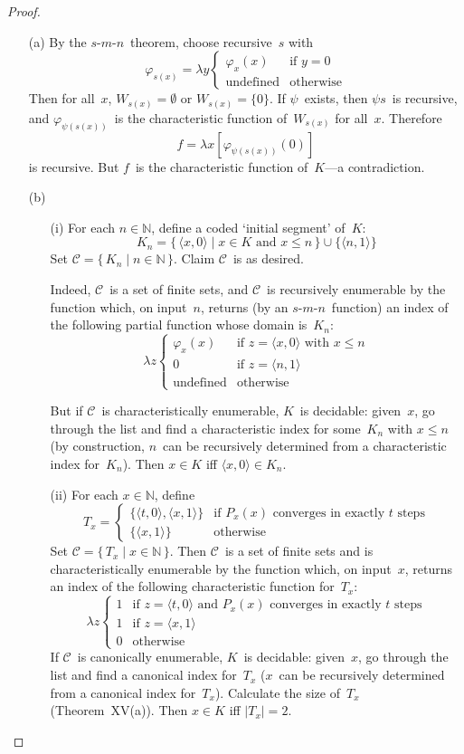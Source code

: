 \documentclass[letterpaper]{article}
\newcommand{\N}{\mathbb{N}}
\newcommand{\C}{\mathcal{C}}
\newcommand{\union}{\cup}
\newcommand{\card}[1]{|{#1}|}
\newcommand{\pair}[2]{\langle{#1},{#2}\rangle}
\newcommand{\smn}{$s$-$m$-$n$}
\theoremstyle{definition}
\theoremstyle{remark}
\theoremstyle{direction}
\begin{document}
\begin{proof}
\begin{enumerate}[itemsep=0pt]
\item[(a)] By the \smn\ theorem, choose recursive~$s$ with
$$\varphi_{s(x)}=\lambda y\begin{cases}
\varphi_x(x)&\text{if }y=0\\
\text{undefined}&\text{otherwise}
\end{cases}$$
Then for all~$x$, $W_{s(x)}=\emptyset$ or $W_{s(x)}=\{0\}$. If $\psi$~exists, then $\psi s$~is recursive, and $\varphi_{\psi(s(x))}$~is the characteristic function of~$W_{s(x)}$ for all~$x$. Therefore
$$f=\lambda x[\varphi_{\psi(s(x))}(0)]$$
is recursive. But $f$~is the characteristic function of~$K$---a contradiction.
\item[(b)]
\begin{enumerate}[itemsep=0pt]
\item[(i)] For each $n\in\N$, define a coded `initial segment' of~$K$:
$$K_n=\{\,\pair{x}{0}\mid x\in K\text{ and }x\le n\,\}\union\{\pair{n}{1}\}$$
Set $\C=\{\,K_n\mid n\in\N\,\}$. Claim $\C$~is as desired.

Indeed, $\C$~is a set of finite sets, and $\C$~is recursively enumerable by the function which, on input~$n$, returns (by an \smn\ function) an index of the following partial function whose domain is~$K_n$:
$$\lambda z\begin{cases}
\varphi_x(x)&\text{if }z=\pair{x}{0}\text{ with }x\le n\\
0&\text{if }z=\pair{n}{1}\\
\text{undefined}&\text{otherwise}
\end{cases}$$

But if $\C$~is characteristically enumerable, $K$~is decidable: given~$x$, go through the list and find a characteristic index for some~$K_n$ with $x\le n$ (by construction, $n$~can be recursively determined from a characteristic index for~$K_n$). Then $x\in K$ iff $\pair{x}{0}\in K_n$.

\item[(ii)] For each $x\in\N$, define
$$T_x=\begin{cases}
\{\pair{t}{0},\pair{x}{1}\}&\text{if }P_x(x)\text{ converges in exactly }t\text{ steps}\\
\{\pair{x}{1}\}&\text{otherwise}
\end{cases}$$
Set $\C=\{\,T_x\mid x\in\N\,\}$. Then $\C$~is a set of finite sets and is characteristically enumerable by the function which, on input~$x$, returns an index of the following characteristic function for~$T_x$:
$$\lambda z\begin{cases}
1&\text{if }z=\pair{t}{0}\text{ and }P_x(x)\text{ converges in exactly }t\text{ steps}\\
1&\text{if }z=\pair{x}{1}\\
0&\text{otherwise}	
\end{cases}$$
If $\C$~is canonically enumerable, $K$~is decidable: given~$x$, go through the list and find a canonical index for~$T_x$ ($x$~can be recursively determined from a canonical index for~$T_x$). Calculate the size of~$T_x$ (Theorem~XV(a)). Then $x\in K$ iff $\card{T_x}=2$.


\end{enumerate}
\end{enumerate}
\end{proof}
\end{document}
